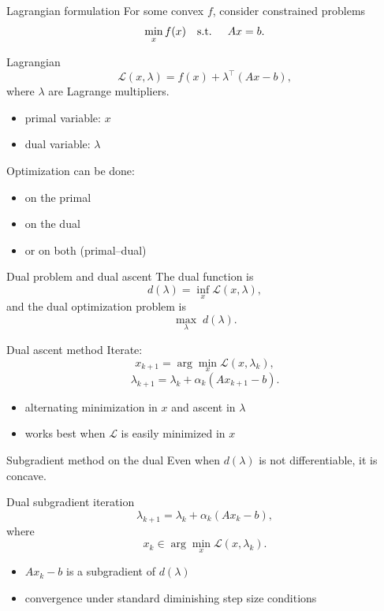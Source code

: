 \documentclass[aspectratio=169]{beamer}
\begin{document}

\begin{frame}{Lagrangian formulation}
For some convex $f$, consider constrained problems
\[
\min_x f(x) \quad \text{s.t. } \quad Ax = b.
\vspace{-8mm}
\]
\pause
\begin{block}{Lagrangian}
\[
\mathcal{L}(x,\lambda)
=
f(x) + \lambda^\top (Ax-b),
\]
where $\lambda$ are Lagrange multipliers.
\end{block}
\pause
\begin{itemize}
    \item primal variable: $x$
    \item dual variable: $\lambda$
\end{itemize}

Optimization can be done:
\begin{itemize}
    \item on the primal
    \item on the dual
    \item or on both (primal–dual)
\end{itemize}
\end{frame}


\begin{frame}{Dual problem and dual ascent}
The dual function is
\[
d(\lambda)=\inf_x \mathcal{L}(x,\lambda),
\]
and the dual optimization problem is
\[
\max_{\lambda} \; d(\lambda).
\]
\pause
\begin{block}{Dual ascent method}
Iterate:
\[
x_{k+1} = \arg\min_x \mathcal{L}(x,\lambda_k),
\]
\[
\lambda_{k+1}
=
\lambda_k + \alpha_k (Ax_{k+1}-b).
\]
\end{block}

\begin{itemize}
    \item alternating minimization in $x$ and ascent in $\lambda$
    \item works best when $\mathcal{L}$ is easily minimized in $x$
\end{itemize}
\end{frame}


\begin{frame}{Subgradient method on the dual}
Even when $d(\lambda)$ is not differentiable, it is concave.

\begin{block}{Dual subgradient iteration}
\[
\lambda_{k+1}
=
\lambda_k
+
\alpha_k (Ax_k - b),
\]
where
\[
x_k \in \arg\min_x \mathcal{L}(x,\lambda_k).
\]
\end{block}
\pause
\begin{itemize}
    \item $Ax_k-b$ is a subgradient of $d(\lambda)$
    \item convergence under standard diminishing step size conditions
\end{itemize}
\end{frame}
\end{document}
